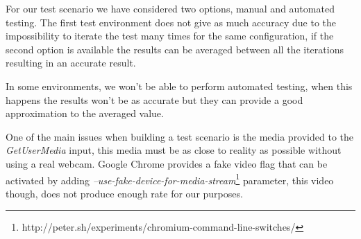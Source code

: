 For our test scenario we have considered two options, manual and automated testing. The first test environment does not give as much accuracy due to the impossibility to iterate the test many times for the same configuration, if the second option is available the results can be averaged between all the iterations resulting in an accurate result.

In some environments, we won't be able to perform automated testing, when this happens the results won't be as accurate but they can provide a good approximation to the averaged value.

One of the main issues when building a test scenario is the media provided to the {\it GetUserMedia} input, this media must be as close to reality as possible without using a real webcam. Google Chrome provides a fake video flag that can be activated by adding {\it --use-fake-device-for-media-stream}\footnote{http://peter.sh/experiments/chromium-command-line-switches/} parameter, this video though, does not produce enough rate for our purposes.


